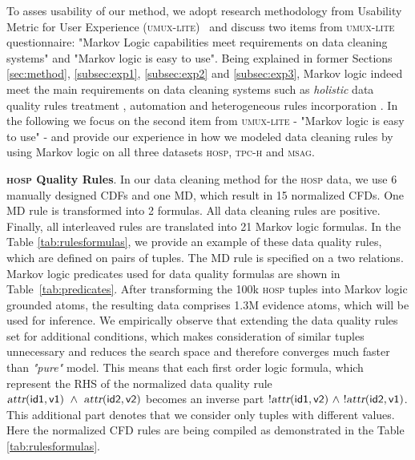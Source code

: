 To asses usability of our method, we adopt research methodology from Usability Metric for User Experience (\textsc{umux-lite})~\cite{Lewis2013UMUX, Finstad2010} and discuss two items from \textsc{umux-lite} questionnaire: "Markov Logic capabilities meet requirements on data cleaning systems" and "Markov logic is easy to use". Being explained in former Sections \ref{sec:method}, \ref{subsec:exp1}, \ref{subsec:exp2} and \ref{subsec:exp3}, Markov logic indeed meet the main requirements on data cleaning systems such as \textit{holistic} data quality rules treatment \cite{Fan:2014:IRM:2628135.2567657, Dallachiesa:2013:NCD:2463676.2465327}, automation \cite{Stonebraker_datacuration} and heterogeneous rules incorporation \cite{chu2013holistic}. In the following we focus on the second item from \textsc{umux-lite} - "Markov logic is easy to use" - and provide our experience in how we modeled data cleaning rules by using Markov logic on all three datasets \textsc{hosp}, \textsc{tpc-h} and \textsc{msag}. %

\textbf{\textsc{hosp} Quality Rules}. In our data cleaning method for the \textsc{hosp} data, we use 6 manually designed CDFs and one MD, which result in 15 normalized CFDs. One MD rule is transformed into 2 formulas. All data cleaning rules are positive. Finally, all interleaved rules are translated into 21 Markov logic formulas. In the Table \ref{tab:rulesformulas}, we provide an example of these data quality rules, which are defined on pairs of tuples. The MD rule is specified on a two relations. Markov logic predicates used for data quality formulas are shown in Table~\ref{tab:predicates}. After transforming the 100k \textsc{hosp} tuples into Markov logic grounded atoms, the resulting data comprises 1.3M evidence atoms, which will be used for inference. We empirically observe that extending the data quality rules set for additional conditions, which makes consideration of similar tuples unnecessary and reduces the search space and therefore converges much faster than \textit{"pure"} model. This means that each first order logic formula, which represent the RHS of the normalized data quality rule $\mathsf{\textsl{attr}(id1, v1)~\wedge~\textsl{attr}(id2, v2)}$ becomes an inverse part $\mathsf{!\textsl{attr}(id1, v2)~\wedge~!\textsl{attr}(id2, v1)}$. This additional part denotes that we consider only tuples with different values. Here the normalized CFD rules are being compiled as demonstrated in the Table \ref{tab:rulesformulas}. 

